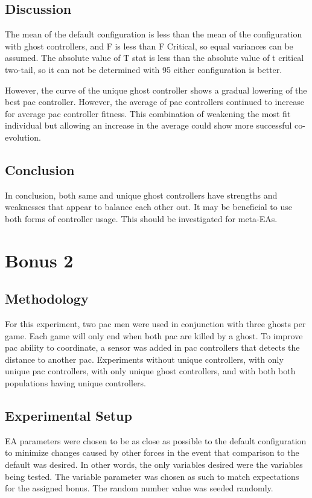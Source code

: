 \documentclass{article}
\newcommand\tab[1][1cm]{\hspace*{#1}}
\begin{document}
\subsection{Discussion}
\begin{flushleft}
The mean of the default configuration is less than the mean of the configuration
 with ghost controllers, and F is less than F Critical, so equal variances can
be assumed. The absolute value of T stat is less than the absolute value of t
critical two-tail, so it can not be determined with 95%
either configuration is better.

\tab
However, the curve of the unique ghost controller shows a gradual lowering of
the best pac controller. However, the average of pac controllers continued to
increase for average pac controller fitness. This combination of weakening the
most fit individual but allowing an increase in the average could show
more successful co-evolution.
\end{flushleft}

\subsection{Conclusion}
\begin{flushleft}
In conclusion, both same and unique ghost controllers have strengths and
weaknesses that appear to balance each other out. It may be beneficial to use
both forms of controller usage. This should be investigated for meta-EAs.
\end{flushleft}

\clearpage
\section{Bonus 2}
\subsection{Methodology}
\begin{flushleft}
For this experiment, two pac men were used in conjunction with three ghosts per
 game. Each game will only end when both pac are killed by a ghost. To improve
 pac ability to coordinate, a sensor was added in pac controllers that detects
 the distance to another pac. Experiments without unique controllers, with only
 unique pac controllers, with only unique ghost controllers, and with both both
 populations having unique controllers.
\end{flushleft}
\subsection{Experimental Setup}
\begin{flushleft}
EA parameters were chosen to be as close as possible to the default
 configuration to minimize changes caused by other forces in the event that
 comparison to the default was desired. In other words, the only variables
 desired were the variables being tested. The variable parameter was chosen as
 such to match expectations for the assigned bonus. The random number value was
 seeded randomly.
\end{flushleft}
\end{document}
